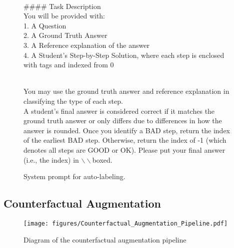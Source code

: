 \begin{figure}[ht]
\begin{minipage}{6in}
\begin{tcolorbox}[width=6in, sharp corners=all, colback=white!95!black]
\-\\
\#\#\#\# Task Description\\
You will be provided with:\\
1. A Question\\
2. A Ground Truth Answer\\
3. A Reference explanation of the answer\\
4. A Student's Step-by-Step Solution, where each step is enclosed with tags and indexed from 0

\-\\
You may use the ground truth answer and reference explanation in classifying the type of each step.\\
A student's final answer is considered correct if it matches the ground truth answer or only differs due to differences in how the answer is rounded.
Once you identify a BAD step, return the index of the earliest BAD step. Otherwise,
return the index of -1 (which denotes all steps are GOOD or OK).
Please put your final answer (i.e., the index) in $\backslash\backslash$boxed{}.
\end{tcolorbox}
    \end{minipage}
    \caption{System prompt for auto-labeling.}
    \label{fig:v5-auto-label-prompt}
\end{figure}

% 

\clearpage

\subsection{Counterfactual Augmentation}
\label{sec:counter-aug}


\begin{figure*}[ht]
    \begin{center}
        \texttt{[image: figures/Counterfactual\_Augmentation\_Pipeline.pdf]}
         \caption{Diagram of the counterfactual augmentation pipeline}
        \label{fig:neg-aug-pipeline}
    \end{center}
\end{figure*}


